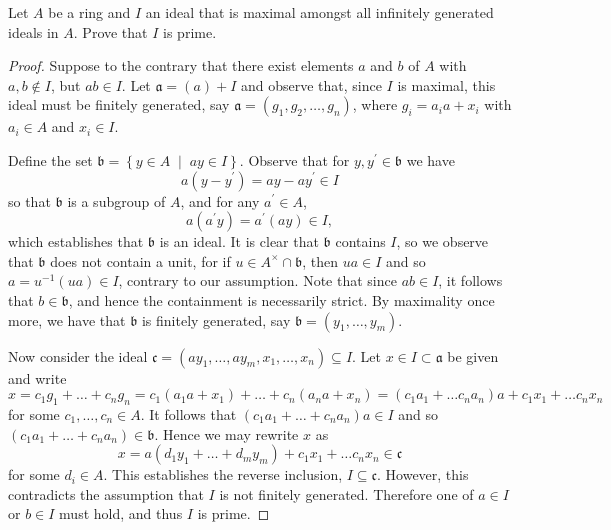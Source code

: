 \documentclass[10pt]{amsart}
\begin{document}
\begin{thm}
  Let $A$ be a ring and $I$ an ideal that is maximal amongst all infinitely generated ideals in $A$.  Prove that $I$ is prime.
  
  \begin{proof}
    Suppose to the contrary that there exist elements $a$ and $b$ of $A$ with $a,b \not \in I$, but $ab \in I$.
    Let $\mathfrak{a} = (a) + I$ and observe that, since $I$ is maximal, this ideal must be finitely generated, say $\mathfrak{a} = (g_1, g_2, \ldots, g_n)$, where $g_i = a_ia + x_i$ with $a_i \in A$ and $x_i \in I$.
    
    Define the set $\mathfrak{b} = \left\{y \in A \;\middle\vert\; ay \in I \right\}$.
    Observe that for $y, y^\prime \in \mathfrak{b}$ we have 
    $$a(y - y^\prime) = ay - ay^\prime \in I$$ 
    so that $\mathfrak{b}$ is a subgroup of $A$, and for any $a^\prime \in A$, 
    $$a(a^\prime y) = a^\prime(ay) \in I,$$
    which establishes that $\mathfrak{b}$ is an ideal.
    It is clear that $\mathfrak{b}$ contains $I$, so we observe that $\mathfrak{b}$ does not contain a unit, for if $u \in A^\times \cap \mathfrak{b}$, then $ua \in I$ and so $a = u^{-1}(ua) \in I$, contrary to our assumption.
    Note that since $ab \in I$, it follows that $b \in \mathfrak{b}$, and hence the containment is necessarily strict.
    By maximality once more, we have that $\mathfrak{b}$ is finitely generated, say $\mathfrak{b} = (y_1, \ldots, y_m)$.
    
    Now consider the ideal $\mathfrak{c} = (ay_1, \ldots, ay_m, x_1, \ldots, x_n) \subseteq I$.
    Let $x \in I \subset \mathfrak{a}$ be given and write 
    $$x = c_1g_1 + \ldots + c_ng_n  = c_1(a_1a + x_1) + \ldots + c_n(a_na + x_n) = (c_1a_1 + \ldots c_na_n)a + c_1x_1 + \ldots c_nx_n$$%
    for some $c_1, \ldots, c_n \in A$.
    It follows that $(c_1a_1 + \ldots + c_na_n)a \in I$ and so $(c_1a_1 + \ldots + c_na_n) \in \mathfrak{b}$.
    Hence we may rewrite $x$ as 
    $$x = a(d_1y_1 + \ldots + d_my_m) + c_1x_1 + \ldots c_nx_n \in \mathfrak{c}$$
    for some $d_i \in A$.
    This establishes the reverse inclusion, $I \subseteq \mathfrak{c}$.
    However, this contradicts the assumption that $I$ is not finitely generated.
    Therefore one of $a \in I$ or $b \in I$ must hold, and thus $I$ is prime.
  \end{proof}
\end{thm}
\end{document}
